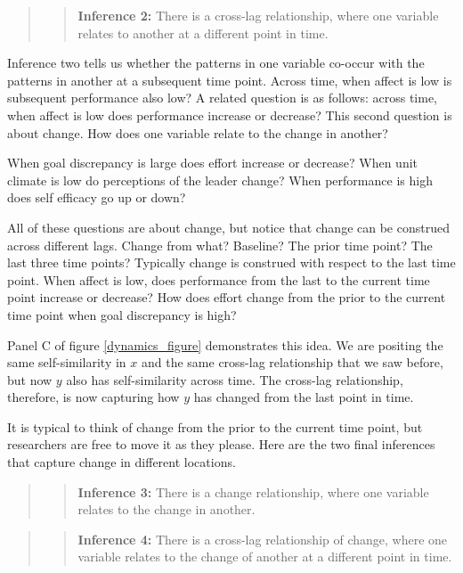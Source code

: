 \documentclass[english,,man]{apa6}
\theoremstyle{definition}
\theoremstyle{definition}
\theoremstyle{definition}
\theoremstyle{remark}
\begin{document}
\begin{quote}
\begin{quote}
\textbf{Inference 2:} There is a cross-lag relationship, where one
variable relates to another at a different point in time.
\end{quote}
\end{quote}

Inference two tells us whether the patterns in one variable co-occur
with the patterns in another at a subsequent time point. Across time,
when affect is low is subsequent performance also low? A related
question is as follows: across time, when affect is low does performance
increase or decrease? This second question is about change. How does one
variable relate to the change in another?

When goal discrepancy is large does effort increase or decrease? When
unit climate is low do perceptions of the leader change? When
performance is high does self efficacy go up or down?

All of these questions are about change, but notice that change can be
construed across different lags. Change from what? Baseline? The prior
time point? The last three time points? Typically change is construed
with respect to the last time point. When affect is low, does
performance from the last to the current time point increase or
decrease? How does effort change from the prior to the current time
point when goal discrepancy is high?

Panel C of figure \ref{dynamics_figure} demonstrates this idea. We are
positing the same self-similarity in \(x\) and the same cross-lag
relationship that we saw before, but now \(y\) also has self-similarity
across time. The cross-lag relationship, therefore, is now capturing how
\(y\) has changed from the last point in time.

It is typical to think of change from the prior to the current time
point, but researchers are free to move it as they please. Here are the
two final inferences that capture change in different locations.

\begin{quote}
\begin{quote}
\textbf{Inference 3:} There is a change relationship, where one variable
relates to the change in another.
\end{quote}
\end{quote}

\begin{quote}
\begin{quote}
\textbf{Inference 4:} There is a cross-lag relationship of change, where
one variable relates to the change of another at a different point in
time.
\end{quote}
\end{quote}
\end{document}
